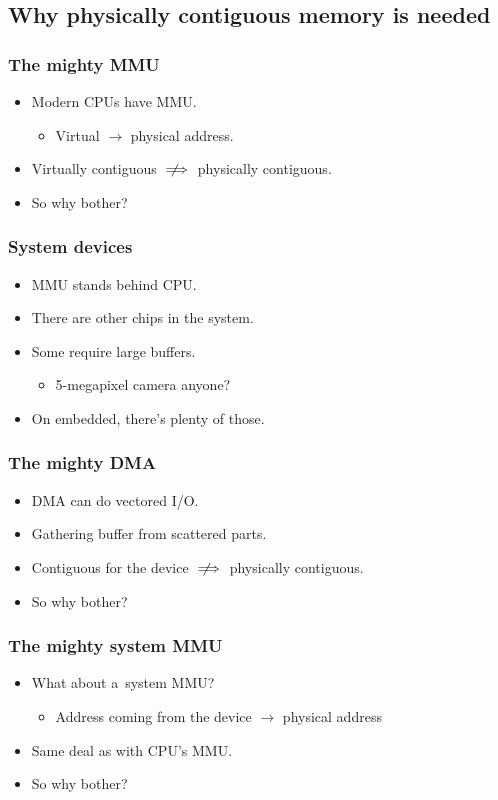 \subsection{Why physically contiguous memory is needed}

\begin{frame}
  \frametitle{The mighty MMU}

  \begin{itemize}
  \item Modern CPUs have MMU.
    \begin{itemize}
    \item Virtual $\rightarrow$ physical address.
    \end{itemize}
  \item Virtually contiguous $\notimplies$ physically contiguous.
  \item So why bother?
  \end{itemize}
\end{frame}

\begin{frame}
  \frametitle{System devices}

  \begin{itemize}
  \item MMU stands behind CPU.
  \item There are other chips in the system.
  \item Some require large buffers.
    \begin{itemize}
    \item 5-megapixel camera anyone?
    \end{itemize}
  \item On embedded, there's plenty of those.
  \end{itemize}
\end{frame}

\begin{frame}
  \frametitle{The mighty DMA}

  \begin{itemize}
  \item DMA can do vectored I/O.
  \item Gathering buffer from scattered parts.
  \item Contiguous for the device $\notimplies$ physically contiguous.
  \item So why bother?
  \end{itemize}
\end{frame}

\begin{frame}
  \frametitle{The mighty system MMU}

  \begin{itemize}
  \item What about a~system MMU?
    \begin{itemize}
    \item Address coming from the device $\rightarrow$ physical
      address
    \end{itemize}
  \item Same deal as with CPU's MMU.
  \item So why bother?
  \end{itemize}
\end{frame}

